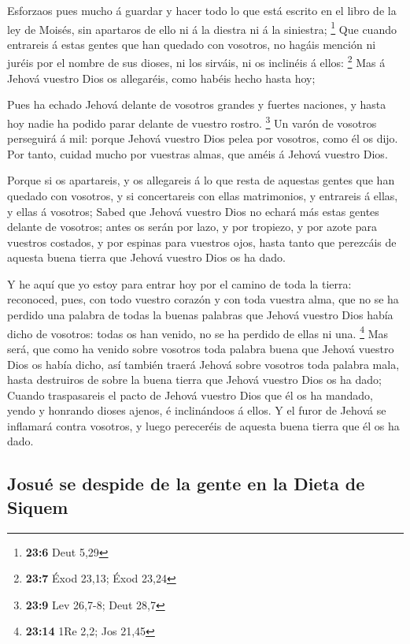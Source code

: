  Esforzaos pues mucho á guardar y hacer todo lo que está
escrito en el libro de la ley de Moisés, sin apartaros de ello ni á la
diestra ni á la siniestra; \footnote{\textbf{23:6} Deut 5,29}
 Que cuando entrareis á estas gentes que han quedado con
vosotros, no hagáis mención ni juréis por el nombre de sus dioses, ni
los sirváis, ni os inclinéis á ellos: \footnote{\textbf{23:7} Éxod
  23,13; Éxod 23,24}  Mas á Jehová vuestro Dios os
allegaréis, como habéis hecho hasta hoy;

 Pues ha echado Jehová delante de vosotros grandes y
fuertes naciones, y hasta hoy nadie ha podido parar delante de vuestro
rostro. \footnote{\textbf{23:9} Lev 26,7-8; Deut 28,7} 
Un varón de vosotros perseguirá á mil: porque Jehová vuestro Dios pelea
por vosotros, como él os dijo.  Por tanto, cuidad mucho
por vuestras almas, que améis á Jehová vuestro Dios.

 Porque si os apartareis, y os allegareis á lo que resta
de aquestas gentes que han quedado con vosotros, y si concertareis con
ellas matrimonios, y entrareis á ellas, y ellas á vosotros;
 Sabed que Jehová vuestro Dios no echará más estas gentes
delante de vosotros; antes os serán por lazo, y por tropiezo, y por
azote para vuestros costados, y por espinas para vuestros ojos, hasta
tanto que perezcáis de aquesta buena tierra que Jehová vuestro Dios os
ha dado.

 Y he aquí que yo estoy para entrar hoy por el camino de
toda la tierra: reconoced, pues, con todo vuestro corazón y con toda
vuestra alma, que no se ha perdido una palabra de todas la buenas
palabras que Jehová vuestro Dios había dicho de vosotros: todas os han
venido, no se ha perdido de ellas ni una. \footnote{\textbf{23:14} 1Re
  2,2; Jos 21,45}  Mas será, que como ha venido sobre
vosotros toda palabra buena que Jehová vuestro Dios os había dicho, así
también traerá Jehová sobre vosotros toda palabra mala, hasta destruiros
de sobre la buena tierra que Jehová vuestro Dios os ha dado;
 Cuando traspasareis el pacto de Jehová vuestro Dios que
él os ha mandado, yendo y honrando dioses ajenos, é inclinándoos á
ellos. Y el furor de Jehová se inflamará contra vosotros, y luego
pereceréis de aquesta buena tierra que él os ha dado.

\hypertarget{josuuxe9-se-despide-de-la-gente-en-la-dieta-de-siquem}{%
\subsection{Josué se despide de la gente en la Dieta de
Siquem}\label{josuuxe9-se-despide-de-la-gente-en-la-dieta-de-siquem}}

